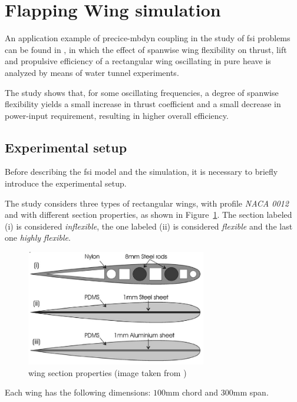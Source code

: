 
\section{Flapping Wing simulation}

An application example of \acrshort{precice}-\acrshort{mbdyn} coupling in the study of \acrshort{fsi} problems can be found in \cite{heathcote2008effect}, in which the effect of spanwise wing flexibility on thrust, lift and propulsive efficiency of a rectangular wing oscillating in pure heave is analyzed by means of water tunnel experiments.

The study shows that, for some oscillating frequencies, a degree of spanwise flexibility yields a small
increase in thrust coefficient and a small decrease in power-input requirement, resulting in higher overall efficiency.

\subsection{Experimental setup}

Before describing the \acrshort{fsi} model and the simulation, it is necessary to briefly introduce the experimental setup.

The study considers three types of rectangular wings, with profile \textit{NACA 0012} and with different section properties, as shown in Figure~\ref{fig:profiles0012}. The section labeled (i) is considered \textit{inflexible}, the one labeled (ii) is considered \textit{flexible} and the last one \textit{highly flexible}.

\begin{figure}[htbp!]
	\centering
	\includegraphics[width=0.7\textwidth]{images/profiles0012}
	\caption{wing section properties (image taken from \cite{heathcote2008effect})}
	\label{fig:profiles0012}
\end{figure}

Each wing has the following dimensions: $100$\si{mm} chord and $300$\si{mm} span.

